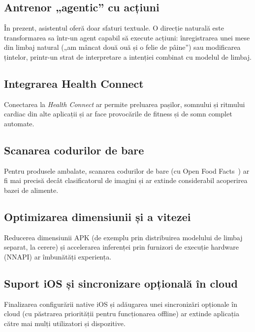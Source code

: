 \documentclass[12pt, a4paper, twoside]{report}
\numberwithin{equation}{section}
\begin{document}
\subsection{Antrenor „agentic'' cu acțiuni}

În prezent, asistentul oferă doar sfaturi textuale. O direcție naturală este transformarea
sa într-un agent capabil să execute acțiuni: înregistrarea unei mese din limbaj natural
(„am mâncat două ouă și o felie de pâine'') sau modificarea țintelor, printr-un strat de
interpretare a intenției combinat cu modelul de limbaj.

\subsection{Integrarea Health Connect}

Conectarea la \textit{Health Connect} ar permite preluarea pașilor, somnului și ritmului
cardiac din alte aplicații și ar face provocările de fitness și de somn complet automate.

\subsection{Scanarea codurilor de bare}

Pentru produsele ambalate, scanarea codurilor de bare (cu Open Food Facts~\cite{openfoodfacts}) ar fi mai precisă
decât clasificatorul de imagini și ar extinde considerabil acoperirea bazei de alimente.

\subsection{Optimizarea dimensiunii și a vitezei}

Reducerea dimensiunii APK (de exemplu prin distribuirea modelului de limbaj separat, la cerere)
și accelerarea inferenței prin furnizori de execuție hardware (NNAPI) ar îmbunătăți experiența.

\subsection{Suport iOS și sincronizare opțională în cloud}

Finalizarea configurării native iOS și adăugarea unei sincronizări opționale în cloud (cu
păstrarea priorității pentru funcționarea offline) ar extinde aplicația către mai mulți
utilizatori și dispozitive.
\end{document}
